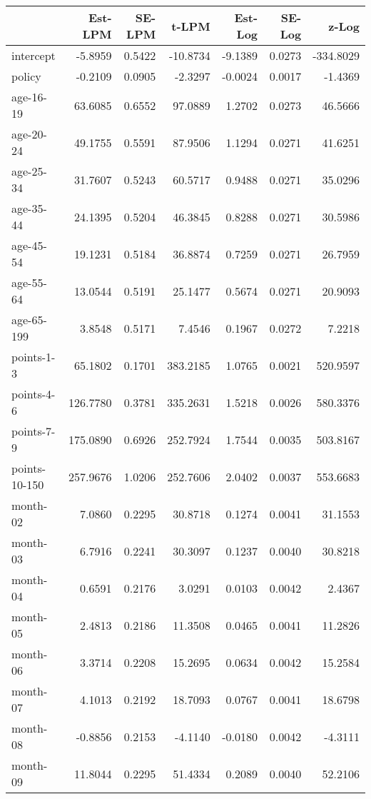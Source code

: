 \documentclass[10pt]{article}
\begin{document}
\begin{table}[ht]
\centering
\begin{tabular}{lrrrrrr}
  \hline
 & Est-LPM & SE-LPM & t-LPM & Est-Log & SE-Log & z-Log \\ 
  \hline
intercept & -5.8959 & 0.5422 & -10.8734 & -9.1389 & 0.0273 & -334.8029 \\ 
  policy & -0.2109 & 0.0905 & -2.3297 & -0.0024 & 0.0017 & -1.4369 \\ 
  age-16-19 & 63.6085 & 0.6552 & 97.0889 & 1.2702 & 0.0273 & 46.5666 \\ 
  age-20-24 & 49.1755 & 0.5591 & 87.9506 & 1.1294 & 0.0271 & 41.6251 \\ 
  age-25-34 & 31.7607 & 0.5243 & 60.5717 & 0.9488 & 0.0271 & 35.0296 \\ 
  age-35-44 & 24.1395 & 0.5204 & 46.3845 & 0.8288 & 0.0271 & 30.5986 \\ 
  age-45-54 & 19.1231 & 0.5184 & 36.8874 & 0.7259 & 0.0271 & 26.7959 \\ 
  age-55-64 & 13.0544 & 0.5191 & 25.1477 & 0.5674 & 0.0271 & 20.9093 \\ 
  age-65-199 & 3.8548 & 0.5171 & 7.4546 & 0.1967 & 0.0272 & 7.2218 \\ 
  points-1-3 & 65.1802 & 0.1701 & 383.2185 & 1.0765 & 0.0021 & 520.9597 \\ 
  points-4-6 & 126.7780 & 0.3781 & 335.2631 & 1.5218 & 0.0026 & 580.3376 \\ 
  points-7-9 & 175.0890 & 0.6926 & 252.7924 & 1.7544 & 0.0035 & 503.8167 \\ 
  points-10-150 & 257.9676 & 1.0206 & 252.7606 & 2.0402 & 0.0037 & 553.6683 \\ 
  month-02 & 7.0860 & 0.2295 & 30.8718 & 0.1274 & 0.0041 & 31.1553 \\ 
  month-03 & 6.7916 & 0.2241 & 30.3097 & 0.1237 & 0.0040 & 30.8218 \\ 
  month-04 & 0.6591 & 0.2176 & 3.0291 & 0.0103 & 0.0042 & 2.4367 \\ 
  month-05 & 2.4813 & 0.2186 & 11.3508 & 0.0465 & 0.0041 & 11.2826 \\ 
  month-06 & 3.3714 & 0.2208 & 15.2695 & 0.0634 & 0.0042 & 15.2584 \\ 
  month-07 & 4.1013 & 0.2192 & 18.7093 & 0.0767 & 0.0041 & 18.6798 \\ 
  month-08 & -0.8856 & 0.2153 & -4.1140 & -0.0180 & 0.0042 & -4.3111 \\ 
  month-09 & 11.8044 & 0.2295 & 51.4334 & 0.2089 & 0.0040 & 52.2106 \\ 

\end{tabular}
\end{table}
\end{document}
